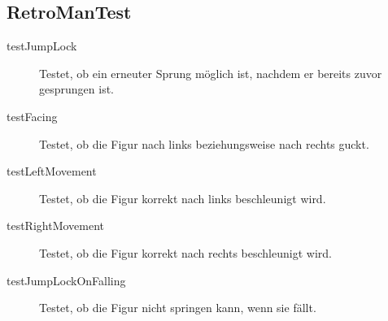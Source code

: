 \documentclass[parskip=full]{scrreprt}
\begin{document}
\subsection{RetroManTest}

\begin{description}
	\item[testJumpLock] Testet, ob ein erneuter Sprung möglich ist, nachdem er bereits zuvor gesprungen ist.
	\item[testFacing] Testet, ob die Figur nach links beziehungsweise nach rechts guckt.
	\item[testLeftMovement] Testet, ob die Figur korrekt nach links beschleunigt wird.
	\item[testRightMovement] Testet, ob die Figur korrekt nach rechts beschleunigt wird.
	\item[testJumpLockOnFalling] Testet, ob die Figur nicht springen kann, wenn sie fällt.
\end{description}
\end{document}
